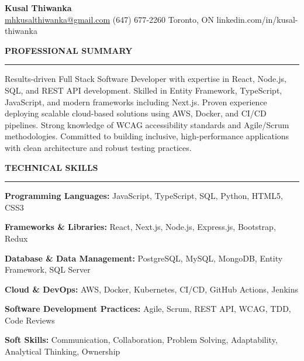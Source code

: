 \documentclass[10pt,letterpaper]{article}
\begin{document}
\begin{center}
{\LARGE\textbf{Kusal Thiwanka}}\\[3pt]
\href{mailto:mhkusalthiwanka@gmail.com}{mhkusalthiwanka@gmail.com}\hspace{2em}%
(647) 677{-}2260\hspace{2em}%
Toronto, ON\hspace{2em}
linkedin.com/in/kusal-thiwanka
\end{center}

\vspace{6pt}

\textbf{PROFESSIONAL SUMMARY}\\[-8pt]
\noindent\rule{\textwidth}{1pt}

\vspace{-2pt}

Results-driven Full Stack Software Developer with expertise in React, Node.js, SQL, and REST API development. Skilled in Entity Framework, TypeScript, JavaScript, and modern frameworks including Next.js. Proven experience deploying scalable cloud-based solutions using AWS, Docker, and CI/CD pipelines. Strong knowledge of WCAG accessibility standards and Agile/Scrum methodologies. Committed to building inclusive, high-performance applications with clean architecture and robust testing practices.

\vspace{8pt}

\textbf{TECHNICAL SKILLS}\\[-8pt]
\noindent\rule{\textwidth}{1pt}

\vspace{-2pt}

\textbf{Programming Languages:} JavaScript, TypeScript, SQL, Python, HTML5, CSS3

\textbf{Frameworks \& Libraries:} React, Next.js, Node.js, Express.js, Bootstrap, Redux

\textbf{Database \& Data Management:} PostgreSQL, MySQL, MongoDB, Entity Framework, SQL Server

\textbf{Cloud \& DevOps:} AWS, Docker, Kubernetes, CI/CD, GitHub Actions, Jenkins

\textbf{Software Development Practices:} Agile, Scrum, REST API, WCAG, TDD, Code Reviews

\textbf{Soft Skills:} Communication, Collaboration, Problem Solving, Adaptability, Analytical Thinking, Ownership

\vspace{8pt}
\end{document}
